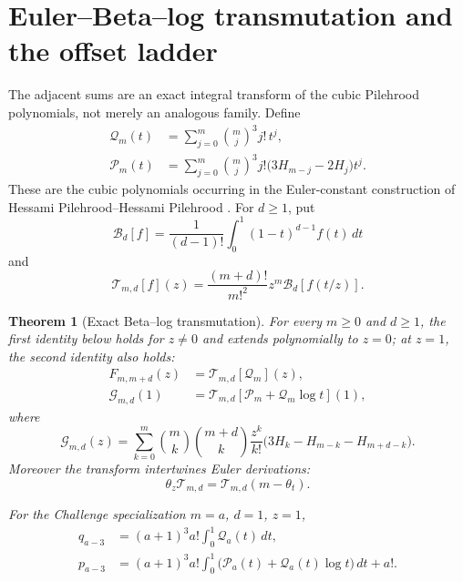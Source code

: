 \documentclass[11pt]{article}
\theoremstyle{keio}
\newtheorem{theorem}{Theorem}[section]
\theoremstyle{definition}
\theoremstyle{remark}
\begin{document}
\section{Euler--Beta--log transmutation and the offset ladder}
\label{sec:beta-log}

The adjacent sums are an exact integral transform of the cubic Pilehrood
polynomials, not merely an analogous family.  Define
\begin{align}
 \mathcal Q_m(t)&=\sum_{j=0}^m\binom mj^3j!\,t^j,
 \label{eq:cubic-Q}\\
 \mathcal P_m(t)&=\sum_{j=0}^m\binom mj^3j!
   \bigl(3H_{m-j}-2H_j\bigr)t^j.
 \label{eq:cubic-P}
\end{align}
These are the cubic polynomials occurring in the Euler-constant construction
of Hessami Pilehrood--Hessami Pilehrood
\cite{Pilehrood2013,PilehroodBell2012}.  For \(d\ge1\), put
\begin{equation}\label{eq:Beta-operator}
 \mathcal B_d[f]=\frac1{(d-1)!}\int_0^1(1-t)^{d-1}f(t)\,dt
\end{equation}
and
\begin{equation}\label{eq:transmutation-operator}
 \mathcal T_{m,d}[f](z)=
 \frac{(m+d)!}{m!^2}z^m\mathcal B_d[f(t/z)].
\end{equation}

\begin{theorem}[Exact Beta--log transmutation]
\label{thm:beta-log-transform}
For every \(m\ge0\) and \(d\ge1\), the first identity below holds for
\(z\ne0\) and extends polynomially to \(z=0\); at \(z=1\), the second
identity also holds:
\begin{align}
 F_{m,m+d}(z)&=\mathcal T_{m,d}[\mathcal Q_m](z),
 \label{eq:offset-F-transform}\\
 \mathcal G_{m,d}(1)&=
 \mathcal T_{m,d}[\mathcal P_m+\mathcal Q_m\log t](1),
 \label{eq:offset-G-transform}
\end{align}
where
\begin{equation}\label{eq:Gmd-def}
 \mathcal G_{m,d}(z)=
 \sum_{k=0}^m\binom mk\binom{m+d}k\frac{z^k}{k!}
 \bigl(3H_k-H_{m-k}-H_{m+d-k}\bigr).
\end{equation}
Moreover the transform intertwines Euler derivations:
\begin{equation}\label{eq:Beta-intertwining}
 \theta_z\mathcal T_{m,d}
 =\mathcal T_{m,d}(m-\theta_t).
\end{equation}

For the Challenge specialization \(m=a\), \(d=1\), \(z=1\),
\begin{align}
 q_{a-3}&=(a+1)^3a!\int_0^1\mathcal Q_a(t)\,dt,
 \label{eq:q-Beta-transform}\\
 p_{a-3}&=(a+1)^3a!
 \int_0^1\bigl(\mathcal P_a(t)+\mathcal Q_a(t)\log t\bigr)\,dt+a!.
 \label{eq:p-Beta-transform}
\end{align}
\end{theorem}
\end{document}
